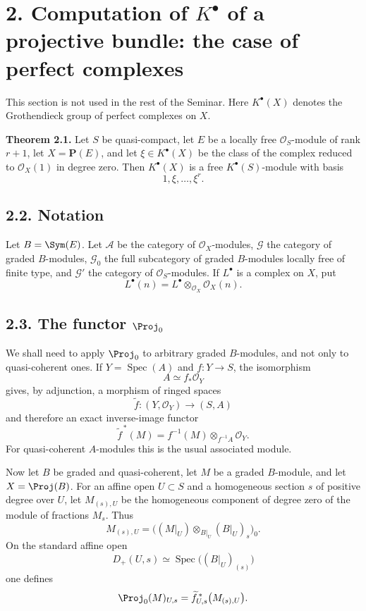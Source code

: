 \documentclass[11pt]{article}
\newcommand{\Spec}{\operatorname{Spec}}
\begin{document}
\section*{2. Computation of \(K^\bullet\) of a projective bundle: the case of perfect complexes}

This section is not used in the rest of the Seminar. Here \(K^\bullet(X)\) denotes the Grothendieck group of perfect complexes on \(X\).

\textbf{Theorem 2.1.} Let \(S\) be quasi-compact, let \(E\) be a locally free \(\mathcal O_S\)-module of rank \(r+1\), let \(X=\mathbf P(E)\), and let \(\xi\in K^\bullet(X)\) be the class of the complex reduced to \(\mathcal O_X(1)\) in degree zero. Then \(K^\bullet(X)\) is a free \(K^\bullet(S)\)-module with basis
\[
  1,\xi,\ldots,\xi^r .
\]

\subsection*{2.2. Notation}
Let \(B=\Sym(E)\). Let \(\mathcal A\) be the category of \(\mathcal O_X\)-modules, \(\mathcal G\) the category of graded \(B\)-modules, \(\mathcal G_0\) the full subcategory of graded \(B\)-modules locally free of finite type, and \(\mathcal G'\) the category of \(\mathcal O_S\)-modules. If \(L^\bullet\) is a complex on \(X\), put
\[
  L^\bullet(n)=L^\bullet\otimes_{\mathcal O_X}\mathcal O_X(n).
\]

\subsection*{2.3. The functor \(\Proj_0\)}
We shall need to apply \(\Proj_0\) to arbitrary graded \(B\)-modules, and not only to quasi-coherent ones. If \(Y=\Spec(A)\) and \(f:Y\to S\), the isomorphism
\[
  A\simeq f_*\mathcal O_Y
\]
gives, by adjunction, a morphism of ringed spaces
\[
  \widetilde f:(Y,\mathcal O_Y)\longrightarrow (S,A)
\]
and therefore an exact inverse-image functor
\[
  \widetilde f^{\,*}(M)=f^{-1}(M)\otimes_{f^{-1}A}\mathcal O_Y.
\]
For quasi-coherent \(A\)-modules this is the usual associated module.

Now let \(B\) be graded and quasi-coherent, let \(M\) be a graded \(B\)-module, and let \(X=\Proj(B)\). For an affine open \(U\subset S\) and a homogeneous section \(s\) of positive degree over \(U\), let \(M_{(s),U}\) be the homogeneous component of degree zero of the module of fractions \(M_s\). Thus
\[
  M_{(s),U}=
  \bigl((M|_U)\otimes_{B|_U}(B|_U)_s\bigr)_0 .
\]
On the standard affine open
\[
  D_+(U,s)\simeq \Spec\bigl((B|_U)_{(s)}\bigr)
\]
one defines
\[
  \Proj_0(M)_{U,s}
  =
  \widetilde f_{U,s}^{\,*}\bigl(M_{(s),U}\bigr).
\]
\end{document}
